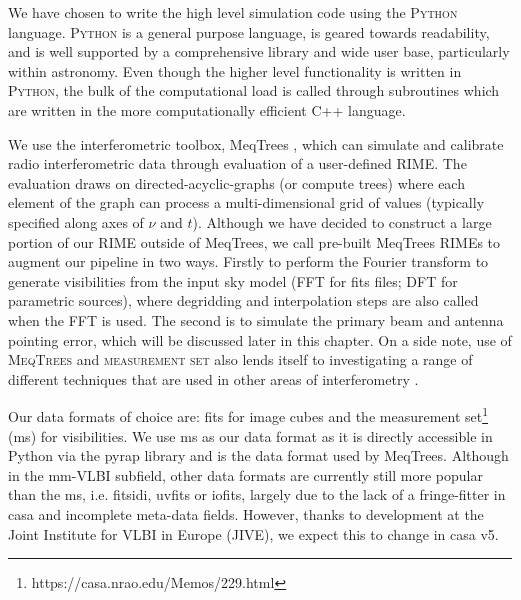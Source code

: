 We have chosen to write the high level simulation code using the \textsc{Python} language. \textsc{Python} is a general purpose language, is geared towards readability, and is well supported by a comprehensive library and wide user base, particularly within astronomy. Even though the higher level functionality is written in \textsc{Python}, the bulk of the computational load is called through subroutines which are written in the more computationally efficient {\sc C++} language.


We use the interferometric toolbox, {\sc MeqTrees} \citep{Noordam_2010}, which can simulate and calibrate radio interferometric data through evaluation of a user-defined RIME. The evaluation draws on directed-acyclic-graphs (or compute trees) where each element of the graph can process a multi-dimensional grid of values (typically specified along axes of $\nu$ and $t$).
Although we have decided to construct a large portion of our RIME outside of {\sc MeqTrees}, we call pre-built {\sc MeqTrees} RIMEs to augment our pipeline in two ways. Firstly to perform the Fourier transform  to generate visibilities from the input sky model (FFT for fits files; DFT for parametric sources), where degridding and interpolation steps are also called when the FFT is used. The second is to simulate the primary beam and antenna pointing error, which will be discussed later in this chapter. On a side note, use of \textsc{MeqTrees} and \textsc{measurement set} also lends itself to investigating a range of different techniques that are used in other areas of interferometry \citep*[e.g.][]{Smirnov_2015}.


Our data formats of choice are: {\sc fits} for image cubes and the {\sc measurement set}\footnote{https://casa.nrao.edu/Memos/229.html} ({\sc ms}) for visibilities. We use {\sc ms} as our data format as it is directly accessible in {\sc Python} via the {\sc pyrap} library and is the data format used by {\sc MeqTrees}. Although in the mm-VLBI subfield, other data formats are currently still more popular than the {\sc ms}, i.e. {\sc fitsidi}, {\sc uvfits} or {\sc iofits}, largely due to the lack of a fringe-fitter in {\sc casa} and incomplete meta-data fields. However,  thanks to development at the Joint Institute for VLBI in Europe (JIVE), we expect this to change in {\sc casa v5}. 


